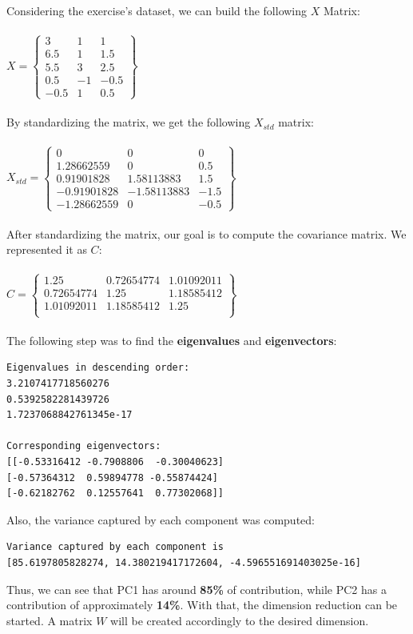 Considering the exercise's dataset, we can build the following $X$ Matrix:\\
\\
$X = \begin{Bmatrix}
	3 & 1 & 1 \\
	6.5 & 1 & 1.5\\
	5.5 & 3 & 2.5\\
	0.5 & -1 & -0.5\\
	-0.5 & 1 & 0.5
\end{Bmatrix}$\\
\\
By standardizing the matrix, we get the following $X_{std}$ matrix:\\
\\
$X_{std} = \begin{Bmatrix}
0 & 0 & 0 \\
1.28662559 & 0 & 0.5\\
0.91901828 & 1.58113883 & 1.5\\
-0.91901828 & -1.58113883 & -1.5\\
-1.28662559 & 0 &-0.5
\end{Bmatrix}$\\
\\
After standardizing the matrix, our goal is to compute the covariance matrix. We represented it as $C:$\\
\\
$C = \begin{Bmatrix}
1.25 & 0.72654774 & 1.01092011 \\
0.72654774 & 1.25 & 1.18585412\\
1.01092011 & 1.18585412 & 1.25\\
\end{Bmatrix}$\\
\\
The following step was to find the \textbf{eigenvalues} and \textbf{eigenvectors}:
\begin{verbatim}
Eigenvalues in descending order:
3.2107417718560276
0.5392582281439726
1.7237068842761345e-17

Corresponding eigenvectors:
[[-0.53316412 -0.7908806  -0.30040623]
[-0.57364312  0.59894778 -0.55874424]
[-0.62182762  0.12557641  0.77302068]]

\end{verbatim}
Also, the variance captured by each component was computed:
\begin{verbatim}
Variance captured by each component is 
[85.6197805828274, 14.380219417172604, -4.596551691403025e-16]
\end{verbatim}
Thus, we can see that PC1 has around \textbf{85\%} of contribution, while PC2 has a contribution of approximately \textbf{14\%}. With that, the dimension reduction can be started. A matrix $W$ will be created accordingly to the desired dimension.

